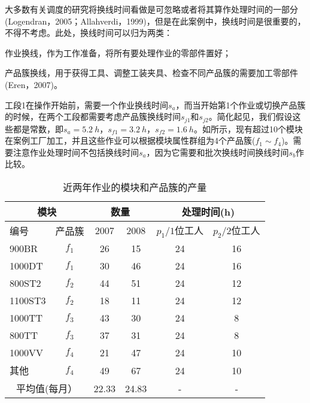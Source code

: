 大多数有关调度的研究将换线时间看做是可忽略或者将其算作处理时间的一部分(Logendran，2005；Allahverdi，1999)，但是在此案例中，换线时间是很重要的，不得不考虑。此处，换线时间可以归为两类：
\begin{inparaenum}
\item 作业换线，作为工作准备，将所有要处理作业的零部件置好；
\item 产品簇换线，用于获得工具、调整工装夹具、检查不同产品簇的需要加工零部件(Eren，2007)。
\end{inparaenum}
工段1在操作开始前，需要一个作业换线时间$s_a$，而当开始第1个作业或切换产品簇的时候，在两个工段都需要考虑产品簇换线时间$s_{j1}$和$s_{j2}$。简化起见，我们假设这些都是常数，即$s_a=5.2\ h$，$s_{f1}=3.2\ h$，$s_{f2}=1.6\ h$。如所示，现有超过10个模块在案例工厂加工，并且这些作业可以根据模块属性群组为4个产品簇($f_1\sim f_4$)。需要注意作业处理时间不包括换线时间$s_a$，因为它需要和批次换线时间换线时间$s_b$作比较。
\begin{table}[htbp]
  \centering
  \caption{近两年作业的模块和产品簇的产量}
    \begin{tabular}{lrcccc}
    \toprule
    \multicolumn{2}{c}{模块} & \multicolumn{2}{c}{数量} & \multicolumn{2}{c}{处理时间(h)} \\
    \midrule
    \multicolumn{1}{l}{编号} & \multicolumn{1}{c}{产品簇 } & 2007  & 2008  & $p_1/1$位工人 & $p_2/2$位工人 \\
    \midrule
    900BR & \multicolumn{1}{c}{$f_1$} & 26    & 15    & 24    & 16 \\
    1000DT & \multicolumn{1}{c}{$f_1$} & 30    & 46    & 24    & 16 \\
    800ST2 & \multicolumn{1}{c}{$f_2$} & 44    & 51    & 24    & 12 \\
    1100ST3 & \multicolumn{1}{c}{$f_2$} & 18    & 11    & 24    & 12 \\
    1000TT & \multicolumn{1}{c}{$f_3$} & 43    & 30    & 24    & 8 \\
    800TT & \multicolumn{1}{c}{$f_3$} & 37    & 31    & 24    & 8 \\
    1000VV & \multicolumn{1}{c}{$f_4$} & 21    & 47    & 24    & 10 \\
    其他 & \multicolumn{1}{c}{$f_4$} & 49    & 67    & 24    & 10 \\
    \multicolumn{2}{c}{平均值(每月）} & 22.33 & 24.83 & -     & - \\
    \bottomrule
    \end{tabular}%
  \label{tab:2yearproduction}%
\end{table}%

